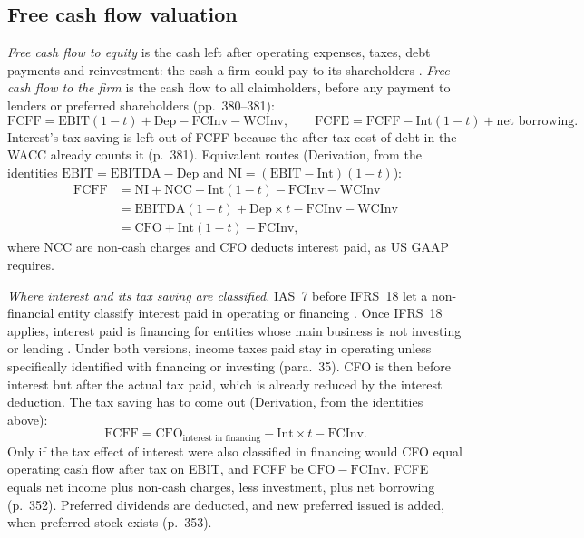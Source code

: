 \subsection{Free cash flow valuation}

\begin{qfmethod}\label{meth:fcff-fcfe-derivation}
 \emph{Free cash flow to equity} is the cash left after operating expenses, taxes, debt payments and reinvestment: the cash a firm could pay to its shareholders \citep[pp.~351--352]{investment-valuation-2012}. \emph{Free cash flow to the firm} is the cash flow to all claimholders, before any payment to lenders or preferred shareholders (pp.~380--381):
\[ \mathrm{FCFF}=\mathrm{EBIT}(1-t)+\mathrm{Dep}-\mathrm{FCInv}-\mathrm{WCInv},\qquad \mathrm{FCFE}=\mathrm{FCFF}-\mathrm{Int}(1-t)+\text{net borrowing}. \]
Interest's tax saving is left out of FCFF because the after-tax cost of debt in the WACC already counts it (p.~381). Equivalent routes (Derivation, from the identities $\mathrm{EBIT}=\mathrm{EBITDA}-\mathrm{Dep}$ and $\mathrm{NI}=(\mathrm{EBIT}-\mathrm{Int})(1-t)$):
\begin{align*}
\mathrm{FCFF}&=\mathrm{NI}+\mathrm{NCC}+\mathrm{Int}(1-t)-\mathrm{FCInv}-\mathrm{WCInv}\\
&=\mathrm{EBITDA}(1-t)+\mathrm{Dep}\times t-\mathrm{FCInv}-\mathrm{WCInv}\\
&=\mathrm{CFO}+\mathrm{Int}(1-t)-\mathrm{FCInv},
\end{align*}
where NCC are non-cash charges and CFO deducts interest paid, as US GAAP requires.

\emph{Where interest and its tax saving are classified.} IAS~7 before IFRS~18 let a non-financial entity classify interest paid in operating or financing \citep[IAS~7 para.~33]{eu-2023-1803-ias7}. Once IFRS~18 applies, interest paid is financing for entities whose main business is not investing or lending \citep[IAS~7 para.~34A as amended]{eu-2026-338-ifrs18}. Under both versions, income taxes paid stay in operating unless specifically identified with financing or investing (para.~35). CFO is then before interest but after the actual tax paid, which is already reduced by the interest deduction. The tax saving has to come out (Derivation, from the identities above):
\[ \mathrm{FCFF}=\mathrm{CFO}_{\text{interest in financing}}-\mathrm{Int}\times t-\mathrm{FCInv}. \]
Only if the tax effect of interest were also classified in financing would CFO equal operating cash flow after tax on EBIT, and FCFF be $\mathrm{CFO}-\mathrm{FCInv}$. FCFE equals net income plus non-cash charges, less investment, plus net borrowing (p.~352). Preferred dividends are deducted, and new preferred issued is added, when preferred stock exists (p.~353).


\end{qfmethod}
